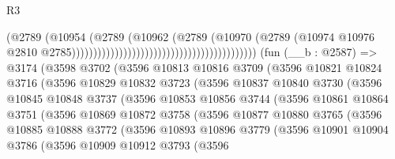 \begin{lexlean}{R3}
\begin{coremodule}
                                                                          (@2789
                                                                            (@10954
                                                                              (@2789
                                                                                (@10962
                                                                                  (@2789
                                                                                    (@10970
                                                                                      (@2789
                                                                                        (@10974
                                                                                          @10976
                                                                                          @2810
                                                                                          @2785)))))))))))))))))))))))))))))))))))))))))))
    (fun (__b : @2587) =>
    @3174
      (@3598
        @3702
        (@3596
          @10813
          @10816
          @3709
          (@3596
            @10821
            @10824
            @3716
            (@3596
              @10829
              @10832
              @3723
              (@3596
                @10837
                @10840
                @3730
                (@3596
                  @10845
                  @10848
                  @3737
                  (@3596
                    @10853
                    @10856
                    @3744
                    (@3596
                      @10861
                      @10864
                      @3751
                      (@3596
                        @10869
                        @10872
                        @3758
                        (@3596
                          @10877
                          @10880
                          @3765
                          (@3596
                            @10885
                            @10888
                            @3772
                            (@3596
                              @10893
                              @10896
                              @3779
                              (@3596
                                @10901
                                @10904
                                @3786
                                (@3596
                                  @10909
                                  @10912
                                  @3793
                                  (@3596

\end{coremodule}
\end{lexlean}

